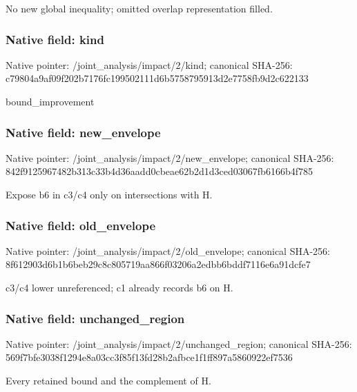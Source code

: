 \documentclass[10pt,a4paper]{article}
\begin{document}
\begingroup\raggedright\sloppy No new global inequality;\allowbreak{} omitted overlap representation filled.\par\endgroup

\subsubsection{Native field: kind}
Native pointer: /joint\_\allowbreak{}analysis/impact/2/kind; canonical SHA-256: c79804a9af09f202b7176fc199502111d6b5758795913d2e7758fb9d2c622133

\begingroup\raggedright\sloppy bound\_\allowbreak{}improvement\par\endgroup

\subsubsection{Native field: new\_\allowbreak{}envelope}
Native pointer: /joint\_\allowbreak{}analysis/impact/2/new\_\allowbreak{}envelope; canonical SHA-256: 842f9125967482b313c33b4d36aadd0cbeae62b2d1d3ced03067fb6166b4f785

\begingroup\raggedright\sloppy Expose b6 in c3/\allowbreak{}c4 only on intersections with H.\par\endgroup

\subsubsection{Native field: old\_\allowbreak{}envelope}
Native pointer: /joint\_\allowbreak{}analysis/impact/2/old\_\allowbreak{}envelope; canonical SHA-256: 8f612903d6b1b6beb29c8c805719aa866f03206a2edbb6bddf7116e6a91dcfe7

\begingroup\raggedright\sloppy c3/\allowbreak{}c4 lower unreferenced;\allowbreak{} c1 already records b6 on H.\par\endgroup

\subsubsection{Native field: unchanged\_\allowbreak{}region}
Native pointer: /joint\_\allowbreak{}analysis/impact/2/unchanged\_\allowbreak{}region; canonical SHA-256: 569f7bfe3038f1294e8a03cc3f85f13fd28b2afbce1f1ff897a5860922ef7536

\begingroup\raggedright\sloppy Every retained bound and the complement of H.\par\endgroup
\end{document}
